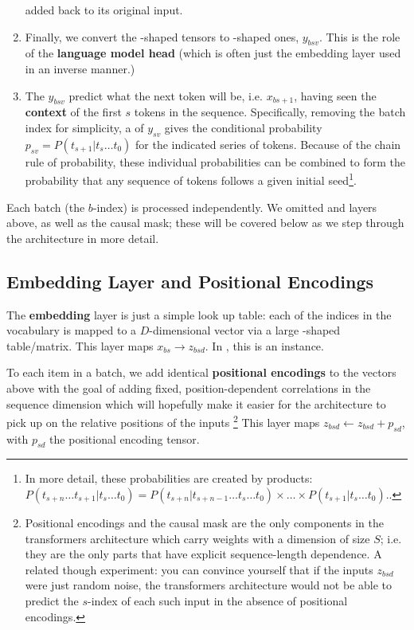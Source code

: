 \documentclass[11pt]{article}
\begin{document}
\begin{enumerate}
              added back to its original input.
	\item Finally, we convert the -shaped
	      tensors to -shaped ones, $ y _{ bsv } $. This is the role of
	      the \textbf{language model head} (which is often just the embedding layer used in an inverse
	      manner.)
	\item  The $ y _{ bsv } $ predict what the next token will be, i.e. $ x _{ bs+1 } $, having seen the \textbf{context}
          of the first $ s $ tokens in the sequence. Specifically, removing the batch index for
          simplicity, a   of $ y _{ sv } $ gives the conditional probability $ p _{ sv
          } = P(t _{ s+1 }|t _{ s } \ldots t _ {0}) $ for the indicated series of tokens. Because of
          the chain rule of probability, these individual probabilities can be combined to form the
          probability that any sequence of tokens follows a given initial seed\footnote{In more
          detail, these probabilities are created by products: $ P(t _{ s+n } \ldots t _{ s+1}| t _{
          s } \ldots  t _{ 0 }) =P(t _{ s+n }| t _{ s+n - 1} \ldots  t _{ s } \ldots  t _{ 0}) \times
      \ldots  \times P(t _{ s+1 } | t _{ s } \ldots  t _{ 0 }) $..}.
\end{enumerate}


Each batch (the $ b $-index) is processed independently. We omitted  and
 layers above, as well as the causal mask; these will be covered below as we step
through the architecture in more detail.



\subsection{Embedding Layer and Positional Encodings \label{subsubsec_embedding_and_pe} }

The \textbf{embedding} layer is just a simple look up table: each of the  indices
in the vocabulary is mapped to a $ D $-dimensional vector via a large -shaped
table/matrix. This layer maps $ x _{ bs } \longrightarrow z _{ bsd } $. In , this is
an  instance.

To each item in a batch, we add identical \textbf{positional encodings} to the vectors above with
the goal of adding fixed, position-dependent correlations in the sequence dimension which will
hopefully make it easier for the architecture to pick up on the relative positions of the inputs
\footnote{Positional encodings and the causal mask are the only components in the transformers
	architecture which carry weights with a dimension of size $ S $; i.e. they are the only parts that
	have explicit sequence-length dependence. A related though experiment: you can convince yourself
	that if the inputs $ z_{ bsd } $
	were just random noise, the transformers architecture would not be able to predict
	the $ s $-index of each such input in the absence of positional encodings. } This layer maps $ z _{
			bsd} \leftarrow z _{ bsd } + p _{ sd } $, with $ p _{ sd } $ the positional encoding tensor.
\end{document}
